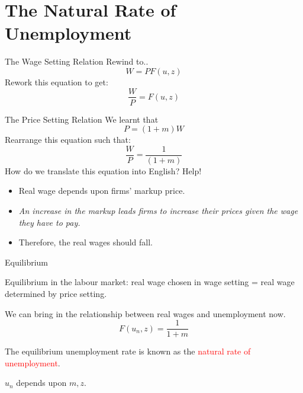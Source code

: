 \documentclass[shownotes,11pt, aspectratio=169]{beamer}
\newenvironment{wideitemize}{\itemize\addtolength{\itemsep}{10pt}}{\enditemize}
\begin{document}
\section{The Natural Rate of Unemployment}
\begin{frame}{The Wage Setting Relation}
Rewind to.. \pause
\[ W = PF(u,z) \] 
\pause
Rework this equation to get: 
\[ \frac{W}{P} = F(u,z) \]
\end{frame}

\begin{frame}{The Price Setting Relation}
We learnt that
\[ P = (1 + m)W \]
Rearrange this equation such that:
\[ \frac{W}{P} = \frac{1}{(1 + m)} \]
How do we translate this equation into English? Help! \pause
\begin{itemize}
\item Real wage depends upon firms' markup price.
\item \textit{An increase in the markup leads firms to increase their prices given the wage
they have to pay.} \pause
\item Therefore, the real wages should fall. 
\end{itemize}
\end{frame}

\begin{frame}
\end{frame}

\begin{frame}{Equilibrium}
\begin{wideitemize}
\item Equilibrium in the labour market: real wage chosen in wage setting = real wage determined by price setting.
\item We can bring in the relationship between real wages and unemployment now. 
     \[ F(u_n, z) = \frac{1}{1 + m} \]
\item The equilibrium unemployment rate is known as the \textcolor{red}{natural rate of unemployment}.
\item $u_n$ depends upon $m, z$.
\end{wideitemize}
\end{frame}
\end{document}
